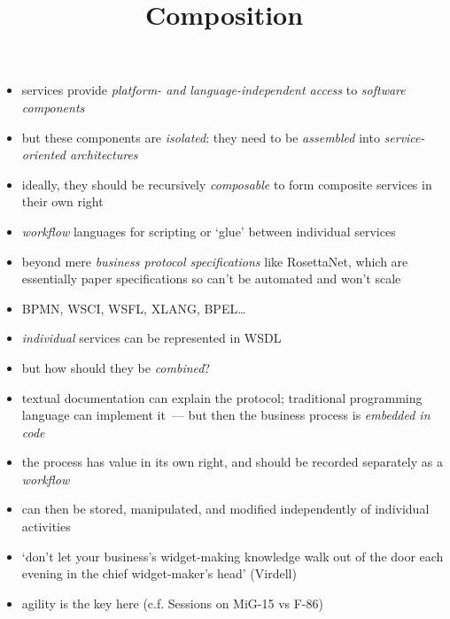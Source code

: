 \documentclass{sepslide-soa-faked} %
\title{Composition}
\begin{document}
\begin{slide}
  \Title
\end{slide}

\begin{slide}
  \Contents
\end{slide}

\begin{slide}
\begin{itemize}
\item services provide \emph{platform- and language-independent access}
  to \emph{software components}
\item but these components are \emph{isolated}: they need to be
  \emph{assembled} into \emph{service-oriented architectures}
\item ideally, they should be recursively \emph{composable} to form
  composite services in their own right
\item \emph{workflow} languages for scripting or `glue' between individual services
\item beyond mere \emph{business protocol specifications} like RosettaNet,
  which are essentially paper specifications so can't be automated and
  won't scale  
\item BPMN, WSCI, WSFL, XLANG, BPEL\ldots
\end{itemize}
\end{slide}

\begin{slide}
\begin{itemize}
\item \emph{individual} services can be represented in WSDL
\item but how should they be \emph{combined}?
\item textual documentation can explain the protocol;
  traditional programming language can implement it~---
  but then the business process is \emph{embedded in code}
\item the process has value in its own right, and should be recorded
separately as a \emph{workflow}
\item can then be stored, manipulated, and modified independently of 
individual activities
\item `don't let your business's widget-making knowledge walk out of the
door each evening in the chief widget-maker's head' (Virdell)
\item agility is the key here (c.f. Sessions on MiG-15 vs F-86)
\end{itemize}
\end{slide}
\end{document}
